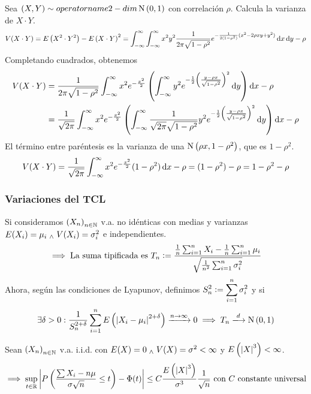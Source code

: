 
\begin{ejer}
	Sea $(X, Y) \sim \\operatorname{2-dim}\operatorname{N}\left(0,1\right)$ con correlación $\rho$. Calcula la varianza de $X\cdot Y$.
	\[V(X\cdot Y) = E\left(X^2\cdot Y^2\right) - E\left(X\cdot Y\right)^2 = \int_{-\infty}^{\infty} \int_{-\infty}^{\infty} x^2y^2\frac{1}{2\pi\sqrt{1-\rho^2}}e^{-\frac{1}{2(1-\rho^2)}(x^2-2\rho xy + y^2)}\odif{x} \odif{y} - \rho\]
	Completando cuadrados, obtenemos
	\[\begin{aligned} %
			V(X\cdot Y) & = \frac{1}{2\pi\sqrt{1-\rho^2}}\int_{-\infty}^{\infty} x^2 e^{-\frac{x^2}{2}} \left(\int_{-\infty}^{\infty} y^2 e^{-\frac{1}{2}\left(\frac{y-\rho x}{\sqrt{1-\rho^2}}\right)^2}\odif{y}\right)\odif{x} -                     \rho           \\
			            & = \frac{1}{\sqrt{2\pi}} \int_{-\infty}^{\infty} x^2 e^{-\frac{x^2}{2}} \left(\int_{-\infty}^{\infty} \frac{1}{\sqrt{2\pi}\sqrt{1-\rho^2}}y^2 e^{-\frac{1}{2}\left(\frac{y-\rho x}{\sqrt{1-\rho^2}}\right)^2}\odif{y}\right) \odif{x} - \rho
		\end{aligned}\]
	El término entre paréntesis es la varianza de una $\operatorname{N}\left(\rho x, 1-\rho^2\right)$, que es $1-\rho^2$.
	\[V(X\cdot Y) = \frac{1}{\sqrt{2\pi}} \int_{-\infty}^{\infty} x^2 e^{-\frac{x^2}{2}}(1-\rho^2)\odif{x} - \rho = (1-\rho^2) - \rho = 1-\rho^2-\rho\]
\end{ejer}


\subsubsection{Variaciones del TCL}

Si consideramos $\left(X_n\right)_{n\in \mathbb{N}}$ v.a. no idénticas con medias y varianzas $E(X_i) = \mu_i \; _{\wedge} \; V(X_i) = \sigma_i^2$ e independientes.
\[\implies \text{La suma tipificada es } T_n \vcentcolon= \frac{\frac{1}{n} \sum_{i=1}^{n} X_i - \frac{1}{n}\sum_{i=1}^{n} \mu_i}{\sqrt{\frac{1}{n^2}\sum_{i=1}^{n} \sigma_i^2}}\]
Ahora, según las condiciones de Lyapunov, definimos $\displaystyle S_n^2 \vcentcolon= \sum_{i=1}^{n} \sigma_i^2$ y si
\[\exists \delta > 0 : \frac{1}{S_n^{2+\delta}} \sum_{i=1}^{n} E\left(\abs{X_i - \mu_i}^{2+\delta}\right) \xrightarrow{n\to\infty} 0 \implies T_n \xlongrightarrow{d} \normal{0,1}\]

\begin{teo}
	Sean $\left(X_n\right)_{n\in \mathbb{N}}$ v.a. i.i.d. con $E(X) = 0 \; _{\wedge} \; V(X) = \sigma^2 < \infty$ y $E\left(\left|X\right|^3\right) < \infty$.
	\[\implies \sup_{t\in \mathbb{R}} \left|P\left(\frac{\sum X_i - n\mu}{\sigma \sqrt{n}} \leq t\right) - \Phi(t)\right| \leq C \frac{E\left(\left|X\right|^3\right)}{\sigma^3}\frac{1}{\sqrt{n}} \text{ con } C \text{ constante universal}\]
\end{teo}

